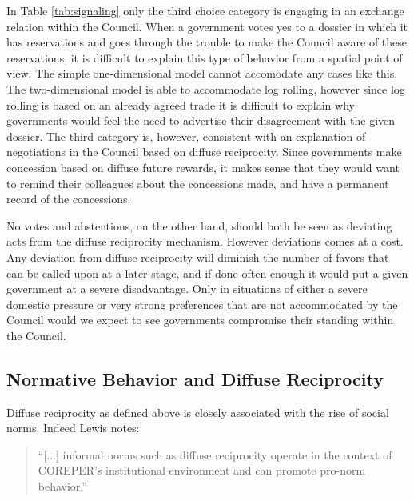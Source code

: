 In Table \ref{tab:signaling} only the third choice category is engaging in an exchange relation within the Council. When a government votes yes to a dossier in which it has reservations and goes through the trouble to make the Council aware of these reservations, it is difficult to explain this type of behavior from a spatial point of view. The simple one-dimensional model cannot accomodate any cases like this. The two-dimensional model is able to accommodate log rolling, however since log rolling is based on an already agreed trade it is difficult to explain why governments would feel the need to advertise their disagreement with the given dossier. The third category is, however, consistent with an explanation of negotiations in the Council based on diffuse reciprocity. Since governments make concession based on diffuse future rewards, it makes sense that they would want to remind their colleagues about the concessions made, and have a permanent record of the concessions. 
 
No votes and abstentions, on the other hand, should both be seen as deviating acts from the diffuse reciprocity mechanism. However deviations comes at a cost. Any deviation from diffuse reciprocity will diminish the number of favors that can be called upon at a later stage, and if done often enough it would put a given government at a severe disadvantage. Only in situations of either a severe domestic pressure or very strong preferences that are not accommodated by the Council would we expect to see governments compromise their standing within the Council. 


\subsection{Normative Behavior and Diffuse Reciprocity}

Diffuse reciprocity as defined above is closely associated with the rise of social norms. Indeed Lewis notes:

\begin{quote}
  ``[...] informal norms such as diffuse reciprocity operate in the context of COREPER's institutional environment and can promote pro-norm behavior.''
\end{quote}

